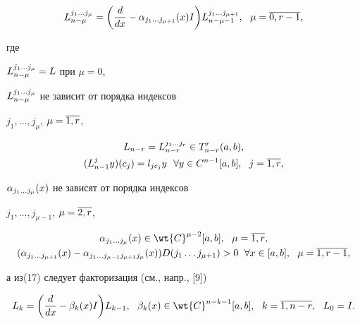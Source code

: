 \begin{equation}


\l{L}{j_1\dotsc j_\mu}{n-\mu}


=\bigg( \mf{d}{dx}-\a_{j_1\dotsc j_{\mu+1}}(x)I\bigg)


\l{L}{j_1\dotsc j_{\mu+1}}{n-\mu-1},\ \ \mu=\o{0,r-1},


\end{equation}


где


${L}^{j_1\dotsc j_\mu}_{n-\mu}=L$ при $\mu=0$,


${L}^{j_1\dotsc j_\mu}_{n-\mu}$ не зависит от порядка индексов


$j_1,\dotsc,j_\mu$, $\mu=\overline{1,r}$,


\begin{gather}


L_{n-r}=\l{L}{j_1\dotsc j_r}{n-r} \in T_{n-r}^r(a,b),\\


(L_{n-1}^j y)(c_j)=


l_{jc_j}y\ \ \forall y\in C^{n-1}\ab,\ \ j=\o{1,r},


\end{gather}


$\alpha_{j_1\dotsc j_\mu}(x)$ не зависят от порядка индексов


$j_1,\dotsc,j_{\mu-1}$, $\mu=\overline{2,r}$,


\begin{gather}


\a_{j_1\dotsc j_\mu}(x)\in \wt{C}^{\mu-2}\ab,\ \ \mu=\o{1,r},\notag\\


%


(\a_{j_1\dotsc j_{\mu+1}}(x)-\a_{j_1\dotsc j_{\mu-1}j_{\mu+1}j_\mu}(x))


D(j_1\dotsc j_{\mu+1})>0\ \; \forall x\in \ab,\ \ \mu=\o{1,r-1},


\end{gather}


а из(17) следует факторизация (см., напр., [9])


\begin{equation}


L_k=\bigg(\mf{d}{dx}-\b_k(x)I\bigg) L_{k-1},\ \ 


\b_k(x)\in\wt{C}^{n-k-1}\ab,\ \ k=\o{1,n-r},\ \ L_0=I.


\end{equation} 





